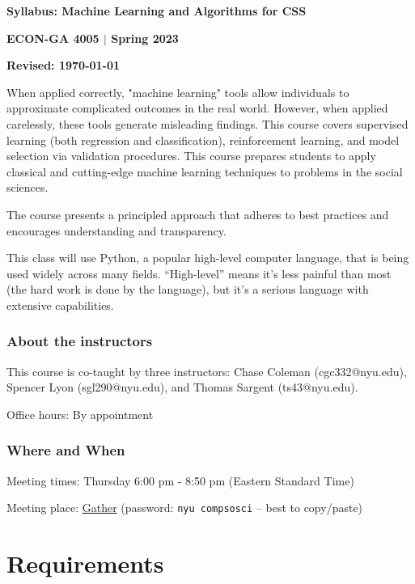 \documentclass[12pt,pdftex,twoside,letterpaper]{exam}
\begin{document}
  \centerline{\Large\bf Syllabus: Machine Learning and Algorithms for CSS}
  \vspace{3mm}
  \centerline{\large\bf ECON-GA 4005 $|$ Spring 2023}
  \vspace{3mm}
  \centerline{\bf Revised: \today}

  \bigskip

  When applied correctly, "machine learning" tools allow individuals to approximate complicated
  outcomes in the real world. However, when applied carelessly, these tools generate misleading
  findings. This course covers supervised learning (both regression and classification),
  reinforcement learning, and model selection via validation procedures. This course prepares
  students to apply classical and cutting-edge machine learning techniques to problems in the
  social sciences.

  The course presents a principled approach that adheres to best practices and encourages
  understanding and transparency.

  This class will use Python, a popular high-level computer language, that is being used widely
  across many fields. ``High-level'' means it's less painful than most (the hard work is done by
  the language), but it's a serious language with extensive capabilities.

  \subsubsection*{About the instructors}

    This course is co-taught by three instructors: Chase Coleman (cgc332@nyu.edu), Spencer Lyon
    (sgl290@nyu.edu), and Thomas Sargent (ts43@nyu.edu).

    Office hours: By appointment

  \subsubsection*{Where and When}

    Meeting times: Thursday 6:00 pm - 8:50 pm (Eastern Standard Time)

    Meeting place: \href{https://app.gather.town/app/70NVJBXquyIwqiOL/NYU%20CSS}{Gather} (password: \texttt{nyu compsosci} -- best to copy/paste)

  \section*{Requirements}
\end{document}
